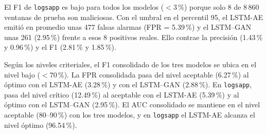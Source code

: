 \documentclass[jou,a4paper,floatsintext,donotrepeattitle]{apa7}
\begin{document}
El F1 de \texttt{logsapp} es bajo para todos los modelos ($< 3$\,\%) porque solo 8 de 8\,860 ventanas de prueba son maliciosas. Con el umbral en el percentil 95, el LSTM-AE emitió en promedio unas 477 falsas alarmas (FPR = 5.39\,\%) y el LSTM--GAN unas 261 (2.95\,\%) frente a esos 8 positivos reales. Ello contrae la precisión (1.43\,\% y 0.96\,\%) y el F1 (2.81\,\% y 1.85\,\%).

Según los niveles criteriales, el F1 consolidado de los tres modelos se ubica en el nivel bajo ($< 70$\,\%). La FPR consolidada pasa del nivel aceptable (6.27\,\%) al óptimo con el LSTM-AE (3.28\,\%) y con el LSTM--GAN (2.88\,\%). En \texttt{logsapp}, pasa del nivel crítico (12.49\,\%) al aceptable con el LSTM-AE (5.39\,\%) y al óptimo con el LSTM--GAN (2.95\,\%). El AUC consolidado se mantiene en el nivel aceptable (80--90\,\%) con los tres modelos, y en \texttt{logsapp} el LSTM-AE alcanza el nivel óptimo (96.54\,\%).
\end{document}
